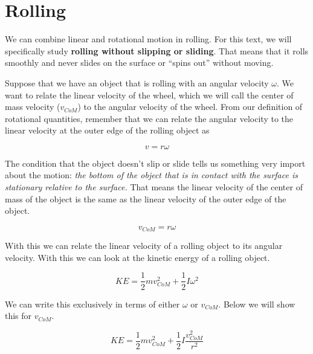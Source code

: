 \documentclass[12pt]{book}
\begin{document}
\section{Rolling}

We can combine linear and rotational motion in rolling. For this text, we will specifically study \textbf{rolling without slipping or sliding}. That means that it rolls smoothly and never slides on the surface or ``spins out'' without moving. 

Suppose that we have an object that is rolling with an angular velocity $\omega$. We want to relate the linear velocity of the wheel, which we will call the center of mass velocity ($v_{CoM}$) to the angular velocity of the wheel. From our definition of rotational quantities, remember that we can relate the angular velocity to the linear velocity at the outer edge of the rolling object as

\begin{equation}
v = r \omega
\end{equation}

The condition that the object doesn't slip or slide tells us something very import about the motion: \textit{the bottom of the object that is in contact with the surface is stationary relative to the surface.} That means the linear velocity of the center of mass of the object is the same as the linear velocity of the outer edge of the object.

\begin{equation}
v_{CoM} = r \omega
\end{equation}

With this we can relate the linear velocity of a rolling object to its angular velocity. With this we can look at the kinetic energy of a rolling object.

\begin{equation}
KE = \frac{1}{2} m v_{CoM}^2 + \frac{1}{2} I \omega^2
\end{equation}

We can write this exclusively in terms of either $\omega$ or $v_{CoM}$. Below we will show this for $v_{CoM}$.

\begin{equation}
KE = \frac{1}{2} m v_{CoM}^2 + \frac{1}{2} I \frac{v_{CoM}^2}{r^2}
\end{equation}
\end{document}
